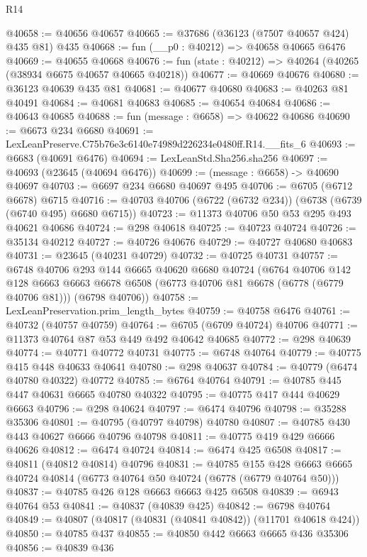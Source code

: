 \begin{lexlean}{R14}
\begin{coremodule}
@40658 := @40656 @40657
@40665 := @37686 (@36123 (@7507 @40657 @424) @435 @81) @435
@40668 := fun (__p0 : @40212) => @40658 @40665 @6476
@40669 := @40655 @40668
@40676 := fun (state : @40212) => @40264 (@40265 (@38934 @6675 @40657 @40665 @40218))
@40677 := @40669 @40676
@40680 := @36123 @40639 @435 @81
@40681 := @40677 @40680
@40683 := @40263 @81 @40491
@40684 := @40681 @40683
@40685 := @40654 @40684
@40686 := @40643 @40685
@40688 := fun (message : @6658) => @40622 @40686
@40690 := @6673 @234 @6680
@40691 := LexLeanPreserve.C75b76e3c6140e74989d226234e0480ff.R14.__fits_6
@40693 := @6683 (@40691 @6476)
@40694 := LexLeanStd.Sha256.sha256
@40697 := @40693 (@23645 (@40694 @6476))
@40699 := (message : @6658) -> @40690 @40697
@40703 := @6697 @234 @6680 @40697 @495
@40706 := @6705 (@6712 @6678) @6715
@40716 := @40703 @40706 (@6722 (@6732 @234)) (@6738 (@6739 (@6740 @495) @6680 @6715))
@40723 := @11373 @40706 @50 @53 @295 @493 @40621 @40686
@40724 := @298 @40618
@40725 := @40723 @40724
@40726 := @35134 @40212
@40727 := @40726 @40676
@40729 := @40727 @40680 @40683
@40731 := @23645 (@40231 @40729)
@40732 := @40725 @40731
@40757 := @6748
    @40706
    @293
    @144
    @6665
    @40620
    @6680
    @40724
    (@6764
      @40706
      @142
      @128
      @6663
      @6663
      @6678
      @6508
      (@6773 @40706 @81 @6678 (@6778 (@6779 @40706 @81)))
      (@6798 @40706))
@40758 := LexLeanPreservation.prim_length_bytes
@40759 := @40758 @6476
@40761 := @40732 (@40757 @40759)
@40764 := @6705 (@6709 @40724) @40706
@40771 := @11373 @40764 @87 @53 @449 @492 @40642 @40685
@40772 := @298 @40639
@40774 := @40771 @40772 @40731
@40775 := @6748 @40764
@40779 := @40775 @415 @448 @40633 @40641
@40780 := @298 @40637
@40784 := @40779 (@6474 @40780 @40322) @40772
@40785 := @6764 @40764
@40791 := @40785 @445 @447 @40631 @6665 @40780 @40322
@40795 := @40775 @417 @444 @40629 @6663
@40796 := @298 @40624
@40797 := @6474 @40796
@40798 := @35288 @35306
@40801 := @40795 (@40797 @40798) @40780
@40807 := @40785 @430 @443 @40627 @6666 @40796 @40798
@40811 := @40775 @419 @429 @6666 @40626
@40812 := @6474 @40724
@40814 := @6474 @425 @6508
@40817 := @40811 (@40812 @40814) @40796
@40831 := @40785
    @155
    @428
    @6663
    @6665
    @40724
    @40814
    (@6773 @40764 @50 @40724 (@6778 (@6779 @40764 @50)))
@40837 := @40785 @426 @128 @6663 @6663 @425 @6508
@40839 := @6943 @40764 @53
@40841 := @40837 (@40839 @425)
@40842 := @6798 @40764
@40849 := @40807 (@40817 (@40831 (@40841 @40842)) (@11701 @40618 @424))
@40850 := @40785 @437
@40855 := @40850 @442 @6663 @6665 @436 @35306
@40856 := @40839 @436

\end{coremodule}
\end{lexlean}
